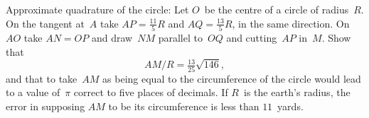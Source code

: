 Approximate quadrature of the circle: Let $O$~be the centre of
a circle of radius~$R$. On the tangent at~$A$ take $AP = \frac{11}{5}R$ and $AQ = \frac{13}{5}R$,
in the same direction. On~$AO$ take $AN = OP$ and draw~$NM$ parallel to~$OQ$
and cutting~$AP$ in~$M$. Show that
\[
AM/R = \tfrac{13}{25}\sqrt{146},
\]
and that to take~$AM$ as being equal to the circumference of the circle would
lead to a value of~$\pi$ correct to five places of decimals. If $R$~is the earth's
radius, the error in supposing $AM$ to be its circumference is less than $11$~yards.

